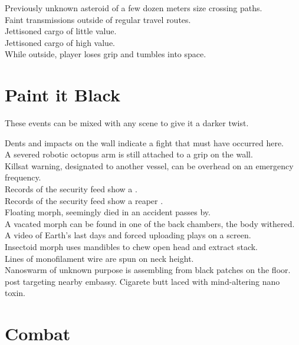 \documentclass[a4]{article}
\begin{document}
\starttableone
Previously unknown asteroid of a few dozen meters size crossing paths.\\
Faint transmissions outside of regular travel routes.\\
Jettisoned cargo of little value.\\
Jettisoned cargo of high value.\\
While outside, player loses grip and tumbles into space.\\
\stoptableone



\section{Paint it Black}

These events can be mixed with any scene to give it a darker twist.

\starttableone
Dents and impacts on the wall indicate a fight that must have occurred here.\\
A severed robotic octopus arm is still attached to a grip on the wall.\\
Killsat warning, designated to another vessel, can be overhead on an emergency frequency.\\
Records of the security feed show a  .\\
Records of the security feed show a reaper .\\
Floating morph, seemingly died in an accident passes by.\\
A vacated morph can be found in one of the back chambers, the body withered.\\
A video of Earth's last days and forced uploading plays on a screen.\\
Insectoid morph uses mandibles to chew open head and extract stack.\\
Lines of monofilament wire are spun on neck height.\\
Nanoswarm of unknown purpose is assembling from black patches on the floor.\\
 post targeting nearby embassy.
Cigarete butt laced with mind-altering nano toxin.
\stoptableone




\section{Combat}
\end{document}
